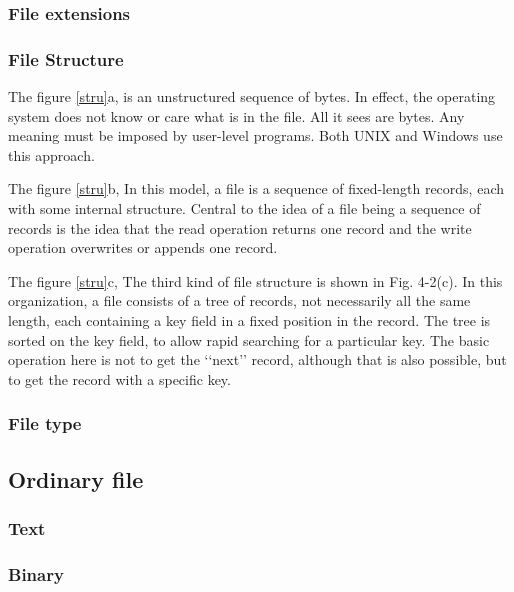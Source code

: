 \subsubsection{File extensions}

\subsubsection{File Structure}

The figure \ref{stru}a, is an unstructured sequence of bytes. In effect, the operating system does not know or care what is in the file. All it sees are bytes. Any meaning must be imposed by user-level programs. Both UNIX and Windows use this approach.

The figure \ref{stru}b, In this model, a file is a sequence of fixed-length records, each with some internal structure. Central to the idea of a file being a sequence of records is the idea that the read operation returns one record and the write operation overwrites or appends one record.

The figure \ref{stru}c, The third kind of file structure is shown in Fig. 4-2(c). In this organization, a file consists of a tree of records, not necessarily all the same length, each containing a key field in a fixed position in the record. The tree is sorted on the key field, to allow rapid searching for a particular key. The basic operation here is not to get the ‘‘next’’ record, although that is also possible, but to get the record with a specific key.

\subsubsection{File type}%



\subsection{Ordinary file}
\subsubsection{Text}
\subsubsection{Binary}
